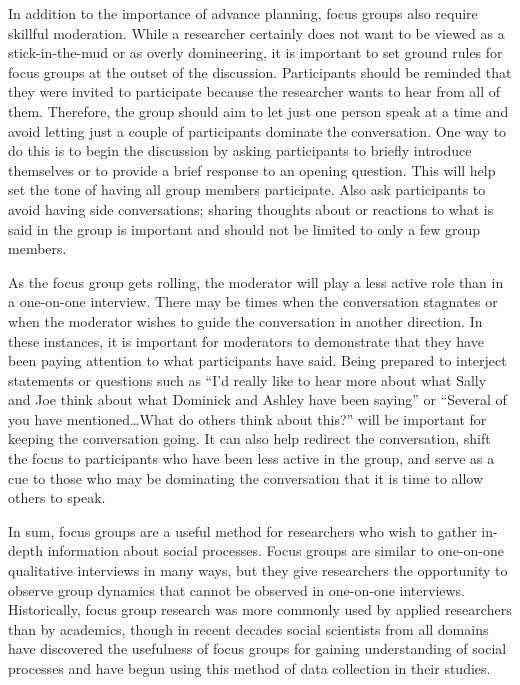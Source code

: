 In addition to the importance of advance planning, focus groups also require skillful moderation. While a researcher certainly does not want to be viewed as a stick-in-the-mud or as overly domineering, it is important to set ground rules for focus groups at the outset of the discussion. Participants should be reminded that they were invited to participate because the researcher wants to hear from all of them. Therefore, the group should aim to let just one person speak at a time and avoid letting just a couple of participants dominate the conversation. One way to do this is to begin the discussion by asking participants to briefly introduce themselves or to provide a brief response to an opening question. This will help set the tone of having all group members participate. Also ask participants to avoid having side conversations; sharing thoughts about or reactions to what is said in the group is important and should not be limited to only a few group members.

As the focus group gets rolling, the moderator will play a less active role than in a one-on-one interview. There may be times when the conversation stagnates or when the moderator wishes to guide the conversation in another direction. In these instances, it is important for moderators to demonstrate that they have been paying attention to what participants have said. Being prepared to interject statements or questions such as ``I'd really like to hear more about what Sally and Joe think about what Dominick and Ashley have been saying'' or ``Several of you have mentioned\ldots What do others think about this?'' will be important for keeping the conversation going. It can also help redirect the conversation, shift the focus to participants who have been less active in the group, and serve as a cue to those who may be dominating the conversation that it is time to allow others to speak.

In sum, focus groups are a useful method for researchers who wish to gather in-depth information about social processes. Focus groups are similar to one-on-one qualitative interviews in many ways, but they give researchers the opportunity to observe group dynamics that cannot be observed in one-on-one interviews. Historically, focus group research was more commonly used by applied researchers than by academics, though in recent decades social scientists from all domains have discovered the usefulness of focus groups for gaining understanding of social processes and have begun using this method of data collection in their studies.

